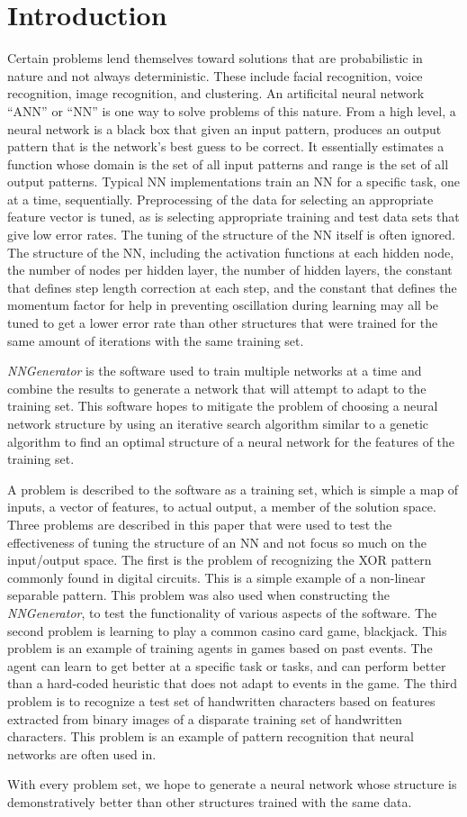 \chapter[Introduction]{Introduction}
Certain problems lend themselves toward solutions that are probabilistic in nature and not always deterministic.
These include facial recognition, voice recognition, image recognition, and clustering. 
An artificital neural network ``ANN'' or ``NN'' is one way to solve problems of this nature. From a high level, a neural network is a black
box that given an input pattern, produces an output pattern that is the network's best guess to be correct. 
It essentially estimates a function whose domain is the set of all input patterns and range is the set of all output patterns. Typical NN implementations train an NN for a specific task, one at a time, sequentially. Preprocessing of the data for selecting an appropriate feature vector is tuned, as is selecting appropriate training and test data sets that give low error rates. The tuning of the structure of the NN itself is often ignored. The structure of the NN, including the activation functions at each hidden node, the number of nodes per hidden layer, the number of hidden layers, the constant that defines step length correction at each step, and the constant that defines the momentum factor for help in preventing oscillation during learning may all be tuned to get a lower error rate than other structures that were trained for the same amount of iterations with the same training set.

{\em NNGenerator} is the software used to train multiple networks at a time and combine the results to generate a network that will attempt to adapt to the training set. This software hopes to mitigate the problem of choosing a neural network structure by using an iterative search algorithm similar to a genetic algorithm to find an optimal structure of a neural network for the features of the training set. 

A problem is described to the software as a training set, which is simple a map of inputs, a vector of features, to actual output, a member of the solution space.
Three problems are described in this paper that were used to test the effectiveness of tuning the structure of an NN and not focus so much on the input/output space. The first is the problem of recognizing the XOR pattern commonly found in digital circuits. This is a simple example of a non-linear separable pattern. This problem was also used when constructing the {\em NNGenerator}, to test the functionality of various aspects of the software. The second problem is learning to play a common casino card game, blackjack. This problem is an example of training agents in games based on past events. The agent can learn to get better at a specific task or tasks, and can perform better than a hard-coded heuristic that does not adapt to events in the game. The third problem is to recognize a test set of handwritten characters based on features extracted from binary images of a disparate training set of handwritten characters. This problem is an example of pattern recognition that neural networks are often used in.

With every problem set, we hope to generate a neural network whose structure is demonstratively better than other structures trained with the same data.
